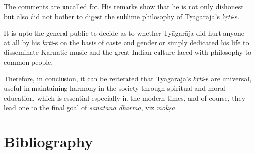 The comments are uncalled for. His remarks show that he is not only dishonest but also did not bother to digest the sublime philosophy of Tyāgarāja’s \textit{kṛti}-s. 

It is upto the general public to decide as to whether Tyāgarāja did hurt anyone at all by his \textit{kṛti}-s on the basis of caste and gender or simply dedicated his life to disseminate Karnatic music and the great Indian culture laced with philosophy to common people.

Therefore, in conclusion, it can be reiterated that Tyāgarāja’s \textit{kṛti}-s are universal, useful in maintaining harmony in the society through spiritual and moral education, which is essential especially in the modern times, and of course, they lead one to the final goal of \textit{sanātana dharma}, viz \textit{mokṣa}.


\section*{Bibliography}

